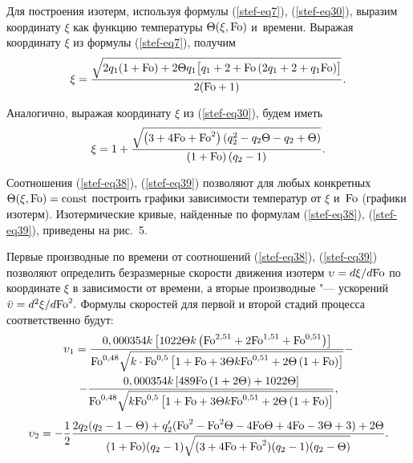 Для построения изотерм, используя формулы (\ref{stef-eq7}), (\ref{stef-eq30}), выразим координату $\xi 
$ как функцию температуры $\Theta (\xi, {\rm Fo})$ и~времени. Выражая 
координату $\xi $ из формулы (\ref{stef-eq7}), получим
\begin{equation}
\label{stef-eq38}
\xi =\frac{\sqrt {2q_1 (1+{\rm Fo})+2\Theta q_1 \bigl[ {q_1 +2+{\rm Fo}\left( {2q_1 
+2+q_1 {\rm Fo}} \right)} \bigr]} }{2({\rm Fo}+1)}.
\end{equation}




Аналогично, выражая координату $\xi $ из (\ref{stef-eq30}), будем иметь
\begin{equation}
\label{stef-eq39}
\xi =1+\frac{\sqrt {\left( {3+4{\rm Fo}+{\rm Fo}^2} \right)\left( {q_2^2 -q_2 \Theta 
-q_2 +\Theta } \right)} }{\left( {1+{\rm Fo}} \right)\left( {q_2 -1} \right)}.
\end{equation}



Соотношения (\ref{stef-eq38}), (\ref{stef-eq39}) позволяют для любых конкретных 
$\Theta ( \xi, {\rm Fo})=\rm const$ построить графики зависимости температур от $\xi $ и~${\rm Fo}$ (графики изотерм). Изотермические кривые, найденные по формулам (\ref{stef-eq38}), 
(\ref{stef-eq39}), приведены на рис.~5.

Первые производные по времени от соотношений (\ref{stef-eq38}), (\ref{stef-eq39}) позволяют определить 
безразмерные скорости движения изотерм $\upsilon =d\xi /d{\rm Fo}$ по координате 
$\xi $ в зависимости от времени, а вторые производные "--- ускорений $\bar 
{\upsilon }=d^2\xi /d{\rm Fo}^2.$ Формулы скоростей для первой и второй стадий 
процесса соответственно будут:
\begin{multline}
\upsilon _1 =\frac{0,000354k\left[ {1022\Theta  k\left( 
{{\rm Fo}^{2,51}+2{\rm Fo}^{1,51}+{\rm Fo}^{0,51}} \right)} \right]}{{\rm Fo}^{0,48}\sqrt {k\cdot 
{\rm Fo}^{0,5}\left[ {1+{\rm Fo}+3\Theta  k{\rm Fo}^{0,51}+2\Theta \left( {1+{\rm Fo}} 
\right)} \right]} }-
\\
\label{stef-eq40}
-\frac{0,000354k\left[ {489{\rm Fo}\left( {1+2\Theta } \right)+1022\Theta } \right]}{{\rm Fo}^{0,48}\sqrt {k{\rm Fo}^{0,5}\left[ {1+{\rm Fo}+3\Theta 
 k{\rm Fo}^{0,51}+2\Theta \left( {1+{\rm Fo}} \right)} \right]} },
\end{multline}
\begin{equation}
\label{stef-eq41}
\upsilon _2 =-\frac{1}{2} \frac{2q_2 (q_2 -1-\Theta )+q'_2 
({\rm Fo}^2-{\rm Fo}^2\Theta -4{\rm Fo} \Theta +4{\rm Fo}-3\Theta +3)+2\Theta 
}{(1+{\rm Fo})(q_2 -1)\sqrt {(3+4{\rm Fo}+{\rm Fo}^2)(q_2 -1)(q_2 -\Theta )} }.
\end{equation}




